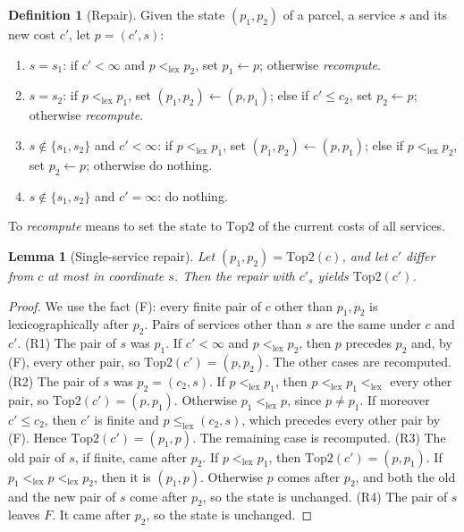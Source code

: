 \documentclass[11pt]{article}
\newtheorem{lemma}[theorem]{Lemma}
\theoremstyle{definition}
\newtheorem{definition}[theorem]{Definition}
\theoremstyle{remark}
\newcommand{\lexlt}{\mathrel{<_{\mathrm{lex}}}}
\newcommand{\lexle}{\mathrel{\le_{\mathrm{lex}}}}
\begin{document}
\begin{definition}[Repair]\label{def:repair}
Given the state $(p_1,p_2)$ of a parcel, a service $s$ and its new cost $c'$, let
$p=(c',s)$:
\begin{enumerate}[label=(R\arabic*),leftmargin=*]
\item $s=s_1$: if $c'<\infty$ and $p\lexlt p_2$, set $p_1\leftarrow p$; otherwise
\emph{recompute}.
\item $s=s_2$: if $p\lexlt p_1$, set $(p_1,p_2)\leftarrow(p,p_1)$; else if $c'\le c_2$, set
$p_2\leftarrow p$; otherwise \emph{recompute}.
\item $s\notin\{s_1,s_2\}$ and $c'<\infty$: if $p\lexlt p_1$, set $(p_1,p_2)\leftarrow(p,p_1)$;
else if $p\lexlt p_2$, set $p_2\leftarrow p$; otherwise do nothing.
\item $s\notin\{s_1,s_2\}$ and $c'=\infty$: do nothing.
\end{enumerate}
To \emph{recompute} means to set the state to $\mathrm{Top2}$ of the current costs of all
services.
\end{definition}

\begin{lemma}[Single-service repair]\label{lem:repair1}
Let $(p_1,p_2)=\mathrm{Top2}(c)$, and let $c'$ differ from $c$ at most in coordinate $s$. Then
the repair with $c'_s$ yields $\mathrm{Top2}(c')$.
\end{lemma}
\begin{proof}
We use the fact (F): every finite pair of $c$ other than $p_1,p_2$ is lexicographically
after $p_2$. Pairs of services other than $s$ are the same under $c$ and $c'$.
(R1) The pair of $s$ was $p_1$. If $c'<\infty$ and $p\lexlt p_2$, then $p$ precedes $p_2$ and,
by (F), every other pair, so $\mathrm{Top2}(c')=(p,p_2)$. The other cases are recomputed.
(R2) The pair of $s$ was $p_2=(c_2,s)$. If $p\lexlt p_1$, then $p\lexlt p_1\lexlt$ every other
pair, so $\mathrm{Top2}(c')=(p,p_1)$. Otherwise $p_1\lexlt p$, since $p\ne p_1$. If moreover
$c'\le c_2$, then $c'$ is finite and $p\lexle(c_2,s)$, which precedes every other pair by
(F). Hence $\mathrm{Top2}(c')=(p_1,p)$. The remaining case is recomputed.
(R3) The old pair of $s$, if finite, came after $p_2$. If $p\lexlt p_1$, then
$\mathrm{Top2}(c')=(p,p_1)$. If $p_1\lexlt p\lexlt p_2$, then it is $(p_1,p)$. Otherwise $p$
comes after $p_2$, and both the old and the new pair of $s$ come after $p_2$, so the state
is unchanged.
(R4) The pair of $s$ leaves $F$. It came after $p_2$, so the state is unchanged.
\end{proof}
\end{document}
